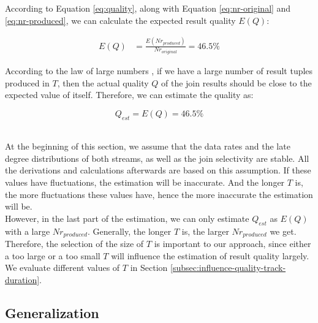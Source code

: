 \documentclass[a4paper, 11pt, twoside]{report}
\begin{document}
According to Equation \ref{eq:quality}, along with Equation \ref{eq:nr-original} and \ref{eq:nr-produced}, we can calculate the expected result quality $E(Q)$:

\begin{equation}
\label{eq:quality_estimation_example}
\begin{split}
E(Q)	&= \frac{E(Nr_{produced})}{Nr_{original}}= 46.5\%
\end{split}
\end{equation}

%

According to the law of large numbers \cite{zbMATH03323586}, if we have a large number of result tuples produced in $T$, then the actual quality $Q$ of the join results should be close to the expected value of itself. Therefore, we can estimate the quality as:

\begin{equation}
\label{eq:quality_estimation_example-final}
	Q_{est}=E(Q)=46.5\%
\end{equation}

\\

At the beginning of this section, we assume that the data rates and the late degree distributions of both streams, as well as the join selectivity are stable. All the derivations and calculations afterwards are based on this assumption. If these values have fluctuations, the estimation will be inaccurate. And the longer $T$ is, the more fluctuations these values have, hence the more inaccurate the estimation will be.\\

However, in the last part of the estimation, we can only estimate $Q_{est}$ as $E(Q)$ with a large $Nr_{produced}$. Generally, the longer $T$ is, the larger $Nr_{produced}$ we get.\\

Therefore, the selection of the size of $T$ is important to our approach, since either a too large or a too small $T$ will influence the estimation of result quality largely. We evaluate different values of $T$ in Section \ref{subsec:influence-quality-track-duration}.\\

\subsection{Generalization}
\label{subsec:generalization-quality-estimation}
\end{document}
